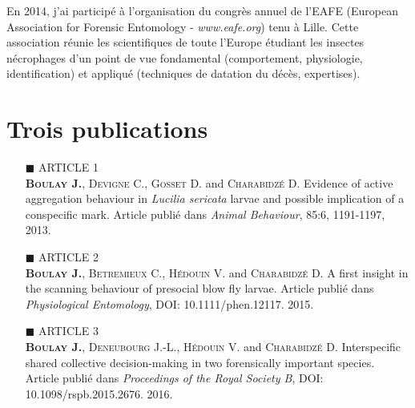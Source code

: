 \documentclass[a4paper,11pt,fleqn]{book} %
\begin{document}
En 2014, j'ai participé à l'organisation du congrès annuel de l'EAFE (European Association for Forensic Entomology - \textit{www.eafe.org}) tenu à Lille. Cette association réunie les scientifiques de toute l'Europe étudiant les insectes nécrophages d'un point de vue fondamental (comportement, physiologie, identification) et appliqué (techniques de datation du décès, expertises).


\chapter{Trois publications}

\begin{itemize} 
\item[\tiny{$\blacksquare$}] ARTICLE 1\\
\textsc{\textbf{Boulay J.}}, \textsc{Devigne} C., \textsc{Gosset} D. and \textsc{Charabidzé} D. Evidence of active aggregation behaviour in \textit{Lucilia sericata} larvae and possible implication of a conspecific mark. Article publié dans \emph{Animal Behaviour}, 85:6, 1191-1197, 2013.\\
\end{itemize}

\begin{itemize} 
\item[\tiny{$\blacksquare$}] ARTICLE 2\\
\textbf{\textsc{Boulay} J.}, \textsc{Betremieux} C., \textsc{Hédouin} V. and \textsc{Charabidzé} D. A first insight in the scanning behaviour of presocial blow fly larvae. Article publié dans \emph{Physiological Entomology}, DOI: 10.1111/phen.12117. 2015.\\
\end{itemize}

\begin{itemize} 
\item[\tiny{$\blacksquare$}] ARTICLE 3\\
\textsc{\textbf{Boulay J.}}, \textsc{Deneubourg} J.-L., \textsc{Hédouin} V. and \textsc{Charabidzé} D. Interspecific shared collective decision-making in two forensically important species. Article publié dans \emph{Proceedings of the Royal Society B}, DOI: 10.1098/rspb.2015.2676. 2016.
\end{itemize}
\end{document}
